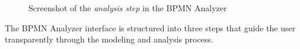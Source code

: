 \documentclass{lmcs} %
\begin{document}
\begin{figure}[ht]
    \centering
    \caption{Screenshot of the \textit{analysis step} in the BPMN Analyzer}
    \label{fig:impl_step1}
\end{figure}

The BPMN Analyzer interface is structured into three steps that guide the user transparently through the modeling and analysis process.
\end{document}
